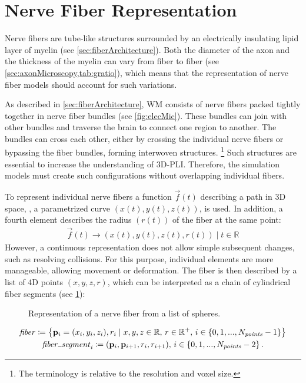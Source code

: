 \section{Nerve Fiber Representation}
\label{sec:nerve_fiber_representation}
%
Nerve fibers are tube-like structures surrounded by an electrically insulating lipid layer of myelin (see \cref{sec:fiberArchitecture}).
Both the diameter of the axon and the thickness of the myelin can vary from fiber to fiber (see \cref{sec:axonMicroscopy,tab:gratio}), which
means that the representation of nerve fiber models should account for such variations.
\par
%
As described in \cref{sec:fiberArchitecture}, \ac{WM} consists of nerve fibers packed tightly together in nerve fiber bundles (see \cref{fig:elecMic}).
These bundles can join with other bundles and traverse the brain to connect one region to another.
The bundles can cross each other, either by crossing the individual nerve fibers or bypassing the fiber bundles, forming interwoven structures.
\footnote{The terminology  is relative to the resolution and voxel size.}
Such structures are essential to increase the understanding of \ac{3D-PLI}.
Therefore, the simulation models must create such configurations without overlapping individual fibers.
\par
%
To represent individual nerve fibers a function $\vec{f}(t)$ describing a path in 3D space, \ie{}, a parametrized curve $(x(t), y(t), z(t))$, is used.
In addition, a fourth element describes the radius $(r(t))$ of the fiber at the same point:
% 
\begin{align}
\vec{f}(t) \rightarrow (x(t), y(t), z(t), r(t)) \; | \; t \in \mathbb{R}
\end{align}
% 
However, a continuous representation does not allow simple subsequent changes, such as resolving collisions.
For this purpose, individual elements are more manageable, allowing movement or deformation.
The fiber is then described by a list of 4D points $(x,y,z,r)$, which can be interpreted as a chain of cylindrical fiber segments (see \cref{fig:fiberReb}):
%
\begin{figure}[!t]
    \setlength{\tikzwidth}{0.85\textwidth}
    \centering
	\caption[]{Representation of a nerve fiber from a list of spheres.}
	\label{fig:fiberReb}
\end{figure}
% 
\begin{align}
\begin{gathered}
\mathit{fiber} \coloneqq \left\{ \vec{p}_i=(x_i,y_i,z_i), r_i \mid x,y,z \in \mathbb{R}, \, r \in \mathbb{R^+}, \, i \in \{0,1,...,N_{\mathit{points}}-1\}\right\} \\
\mathit{fiber\tum{}segment}_i \coloneqq (\vec{p}_i, \vec{p}_{i+1}, r_i, r_{i+1}), \, i \in \{0,1,...,N_{\mathit{points}}-2\} \, .
\end{gathered}
\end{align}
